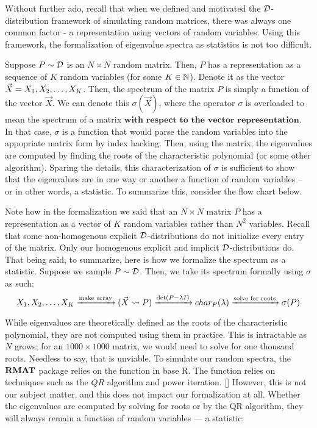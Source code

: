 Without further ado, recall that when we defined and motivated the $\D$-distribution framework of simulating random matrices, there was always one common factor - a representation using vectors of random variables.
Using this framework, the formalization of eigenvalue spectra as statistics is not too difficult.

\begin{formalization}
Suppose $P \sim \D$ is an $N \times N$ random matrix.
Then, $P$ has a representation as a sequence of $K$ random variables (for some $K \in \N$).
Denote it as the vector $\vec{X} = \seqo[K]{X}$.
Then, the spectrum of the matrix $P$ is simply a function of the vector $\vec{X}$.
We can denote this $\sigma(\vec{X})$, where the operator $\sigma$ is overloaded to mean the spectrum of a matrix $\textbf{with respect to the vector representation}$.
In that case, $\sigma$ is a function that would parse the random variables into the appopriate matrix form by index hacking.
Then, using the matrix, the eigenvalues are computed by finding the roots of the characteristic polynomial (or some other algorithm).
Sparing the details, this characterization of $\sigma$ is sufficient to show that the eigenvalues are in one way or another a function of random variables -- or in other words, a statistic.
To summarize this, consider the flow chart below.
\end{formalization}

Note how in the formalization we said that an $N \times N$ matrix $P$ has a representation as a vector of $K$ random variables rather than $N^2$ variables.
Recall that some non-homogenous explicit $\D$-distributions do not initialize every entry of the matrix. Only our homogenous explicit and implicit $\D$-distributions do.
That being said, to summarize, here is how we formalize the spectrum as a statistic. Suppose we sample $P \sim \D$. Then, we take its spectrum formally using $\sigma$ as such:\hfill
$$ X_1,X_2,\dots,X_K \xra{\text{make array}} (\vec{X} \rightsquigarrow P) \xra{\det(P - \lambda I)} char_{P}(\lambda) \xra{\text{solve for roots}} \sigma(P) $$

\begin{remark}[Computation]
While eigenvalues are theoretically defined as the roots of the characteristic polynomial, they are not computed using them in practice.
This is intractable as $N$ grows; for an $1000 \times 1000$ matrix, we would need to solve for one thousand roots.
Needless to say, that is unviable.
To simulate our random spectra, the $\RMAT$ package relies on the  function in base R.
The function relies on techniques such as the $QR$ algorithm and power iteration. [\cite{qr}]
However, this is not our subject matter, and this does not impact our formalization at all.
Whether the eigenvalues are computed by solving for roots or by the QR algorithm, they will always remain a function of random variables --- a statistic.
\end{remark}


